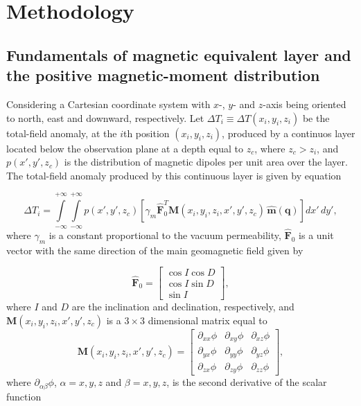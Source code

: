 \section{Methodology}
\label{sec:methodology}

\subsection{Fundamentals of magnetic equivalent layer and the positive magnetic-moment distribution}
\label{subsec:mag_eqlayer}

Considering a Cartesian coordinate system with $x$-, $y$- and $z$-axis being oriented to north, east and downward, respectively. Let $\Delta T_i \equiv \Delta T (x_i,y_i,z_i)$ be the total-field anomaly, at the $i$th position $(x_i,y_i,z_i)$, produced by a continuos layer located below the observation plane at a depth equal to $z_c$, where $z_c > z_i$, and $p(x',y',z_c)$ is the distribution of magnetic dipoles per unit area over the layer. The total-field anomaly produced by this continuous layer is given by equation 

\begin{equation}
\Delta T_i = \int \limits_{-\infty}^{+\infty } \int \limits_{-\infty}^{+\infty }  p(x',y',z_c)  [\gamma_m \hat{\mathbf{F}}_0^T \mathbf{M}(x_i,y_i,z_i,x',y',z_c) \,\hat{\mathbf{m}}(\mathbf{q})] dx' \,dy',
\label{eq:continuous_layer}
\end{equation}
where $\gamma_m$ is a constant proportional to the vacuum permeability, $\hat{\mathbf{F}}_0$ is a unit vector with the same direction of the main geomagnetic field given by

\begin{equation}
	\hat{\mathbf{F}}_0 =
	\left[ \begin{array}{c}
		 \cos I \cos D \\
		 \cos I \sin D \\
		 \sin I     
	\end{array} \right] ,
	\label{eq:main_field}
\end{equation}
where $I$ and $D$ are the inclination and declination, respectively, and $\mathbf{M}(x_i,y_i,z_i,x',y',z_c)$ is a $3 \times 3$ dimensional matrix equal to  
\begin{equation}
\mathbf{M}(x_i,y_i,z_i,x',y',z_c) =
\left[ \begin{array}{ccc}
\partial_{xx} \phi & \partial_{xy} \phi &\partial_{xz} \phi \\  \partial_{yx} \phi & \partial_{yy} \phi &\partial_{yz} \phi \\  \partial_{zx} \phi &\partial_{zy}\phi  & \partial_{zz} \phi    
\end{array} \right] ,
\label{eq:H}
\end{equation}
where $\partial_{\alpha \beta} \phi$, $\alpha = x, y, z$ and $\beta = x, y, z$, is the second derivative of the scalar function 

